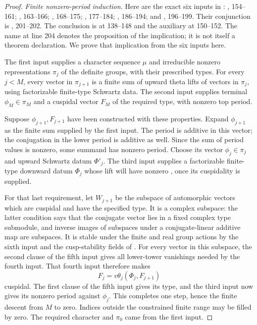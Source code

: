\documentclass[11pt,a4paper]{article}
\theoremstyle{definition}\newtheorem{remark}[theorem]{Remark}
\begin{document}
\begin{proof}
\textit{Finite nonzero-period induction.}
Here are the exact six inputs in :
, 154--161;
, 163--166;
, 168--175;
, 177--184;
, 186--194; and
, 196--199.
Their conjunction is , 201--202.
The conclusion  is at 138--148 and the auxiliary
 at 150--152.
The name  at line 204 denotes the proposition of
the implication; it is not itself a theorem declaration.
We prove that implication from the six inputs here.

The first input supplies a character sequence $\mu$ and irreducible nonzero
representations $\pi_j$ of the definite groups, with their prescribed types.
For every $j<M$, every vector in $\pi_{j+1}$ is a finite sum of upward theta
lifts of vectors in $\pi_j$, using factorizable finite-type Schwartz data.
The second input supplies terminal $\phi_M\in\pi_M$ and a cuspidal vector
$F_M$ of the required type, with nonzero top period.

Suppose $\phi_{j+1},F_{j+1}$ have been constructed with these properties.
Expand $\phi_{j+1}$ as the finite sum supplied by the first input.
The period is additive in this vector; the conjugation in the lower
period is additive as well. Since the sum of period values is nonzero,
some summand has nonzero period. Choose its vector $\phi_j\in\pi_j$ and
upward Schwartz datum $\Phi'_j$.
The third input supplies a factorizable finite-type downward datum $\Phi_j$
whose lift will have nonzero , once its cuspidality is supplied.

For that last requirement, let $W_{j+1}$ be the subspace of automorphic
vectors which are cuspidal and have the specified  type.
It is a complex subspace: the latter condition says that the conjugate
vector lies in a fixed complex type submodule, and inverse images of
subspaces under a conjugate-linear additive map are subspaces.
It is stable under the finite and real group actions by the sixth input
and the cusp-stability fields of .
For every vector in this subspace, the second clause of the fifth input
gives all lower-tower vanishings needed by the fourth input.
That fourth input therefore makes
\[
 F_j=v\theta_j(\Phi_j,F_{j+1})
\]
cuspidal. The first clause of the fifth input gives its  type,
and the third input now gives its nonzero period against $\phi_j$.
This completes one step, hence the finite descent from $M$ to zero.
Indices outside the constrained finite range may be filled by zero.
The required character and $\pi_0$ came from the first input.


\end{proof}
\end{document}
